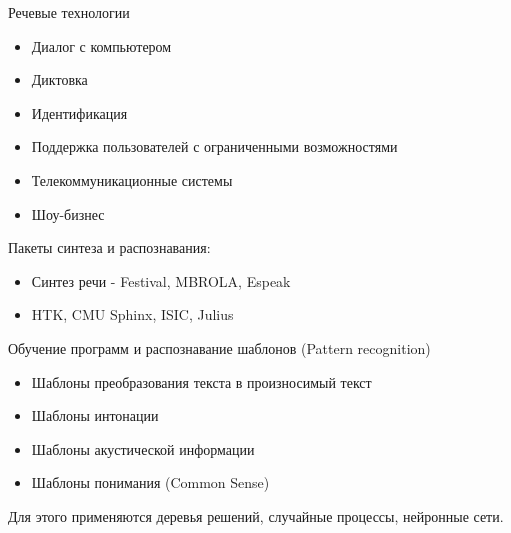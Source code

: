 \documentclass{seminar}
\begin{document}
\sffamily

\begin{slide}


\end{slide}

\begin{slide}

Речевые технологии

\begin{itemize}
\item Диалог с компьютером
\item Диктовка
\item Идентификация
\item Поддержка пользователей с ограниченными возможностями
\item Телекоммуникационные системы
\item Шоу-бизнес
\end{itemize}

\end{slide}

\begin{slide}
Пакеты синтеза и распознавания:

\begin{itemize}
\item Синтез речи - Festival, MBROLA, Espeak
\item HTK, CMU Sphinx, ISIC, Julius
\end{itemize}

\end{slide}

\begin{slide}

Обучение программ и распознавание шаблонов (Pattern recognition)

\begin{itemize}
\item Шаблоны преобразования текста в произносимый текст
\item Шаблоны интонации
\item Шаблоны акустической информации
\item Шаблоны понимания (Common Sense)
\end{itemize}

Для этого применяются деревья решений, случайные процессы, нейронные сети.

\end{slide}
\end{document}
